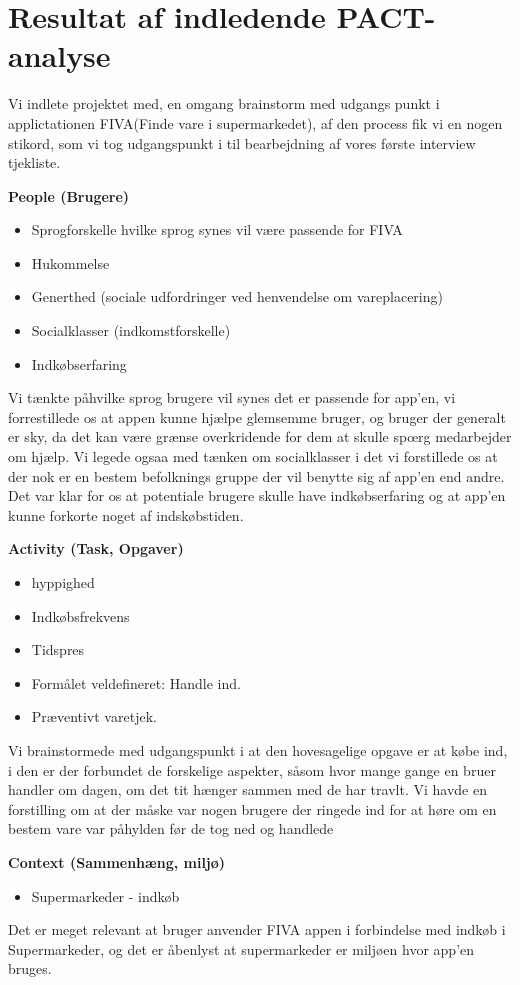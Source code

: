 \documentclass[12pt]{article}
\begin{document}
\newpage
\section{Resultat af indledende PACT-analyse}
Vi indlete projektet med, en omgang brainstorm med udgangs punkt i applictationen FIVA(Finde vare i supermarkedet), af den process fik vi 
en nogen stikord, som vi tog udgangspunkt i til bearbejdning af vores f\o rste interview tjekliste.
 
\textbf{People (Brugere)}
\begin{itemize} 
\item Sprogforskelle hvilke sprog synes vil v\ae re passende for FIVA
\item Hukommelse 
\item Generthed (sociale udfordringer ved henvendelse om vareplacering)
\item Socialklasser (indkomstforskelle)
\item Indkøbserfaring
\end{itemize}
Vi t\ae nkte p\aa hvilke sprog brugere vil synes det er passende for app'en, vi forrestillede os at appen kunne hj\ae lpe glemsemme bruger,
og bruger der generalt er sky, da det kan v\ae re gr\ae nse overkridende for dem at skulle sp\oe rg medarbejder om hj\ae lp. Vi legede ogsaa
med t\ae nken om socialklasser i det vi forstillede os at der nok er en bestem befolknings gruppe der vil benytte sig af app'en end andre.
Det var klar for os at potentiale brugere skulle have indk\o bserfaring og at app'en kunne forkorte noget af indsk\o bstiden.  

\textbf{Activity (Task, Opgaver)} 
\begin{itemize}
\item hyppighed 
\item Indkøbsfrekvens  
\item Tidspres
\item Formålet veldefineret: Handle ind.
\item Præventivt varetjek. 
\end{itemize}
Vi brainstormede med udgangspunkt i at den hovesagelige opgave er at k\o be ind, i den er der forbundet de forskelige aspekter, s\aa  som 
hvor mange gange en bruer handler om dagen, om det tit h\ae nger sammen med de har travlt. Vi havde en forstilling om at der m\aa ske var
nogen brugere der ringede ind for at h\o re om en bestem vare var p\aa  hylden f\o r de tog ned og handlede

\textbf{Context (Sammenh\ae ng, milj\o )}
\begin{itemize}
\item Supermarkeder - indk\o b
\end{itemize}
Det er meget relevant at bruger anvender FIVA appen i forbindelse med indk\o b i Supermarkeder, og det er \aa benlyst at supermarkeder
er milj\o en hvor app'en bruges. 
\end{document}
